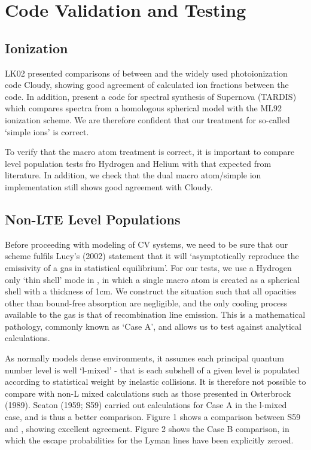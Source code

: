 \documentclass[useAMS,usenatbib, onecolumn]{mn2ejm}
\begin{document}
\section{Code Validation and Testing}
\subsection{Ionization}

LK02 presented comparisons of between \py and the widely used photoionization code Cloudy, showing good agreement 
of calculated ion fractions between the code. In addition, \cite{tardis} present a code for 
spectral synthesis of Supernova (\textsc{TARDIS}) which compares spectra from a homologous spherical model with
the ML92 ionization scheme. We are therefore confident that our treatment for so-called `simple ions' is correct.

To verify that the macro atom treatment is correct, it is important to compare level population tests 
fro Hydrogen and Helium with that expected from literature. In addition, we check that the dual macro atom/simple ion
implementation still shows good agreement with Cloudy.



\subsection{Non-LTE Level Populations}

Before proceeding with modeling of CV systems, we need to be sure that our scheme fulfils Lucy's (2002) 
statement that it will `asymptotically reproduce the emissivity of a gas in statistical equilibrium'.
For our tests, we use a Hydrogen only `thin shell' mode in \py, in which a single macro atom is created as a spherical 
shell with a thickness of 1cm. We construct the situation such that all opacities other than 
bound-free absorption are negligible, and the only cooling process available to the gas is that of
recombination line emission. This is a mathematical pathology, commonly known as `Case A', and allows
us to test against analytical calculations.

As \py normally models dense environments, it assumes each principal quantum number level is
well `l-mixed' - that is each subshell of a given level is populated according to statistical weight by
inelastic collisions. It is therefore not possible to compare with non-L mixed calculations such as 
those presented in Osterbrock (1989\nocite{oster}). Seaton (1959; S59\nocite{seaton}) carried out calculations
for Case A in the l-mixed case, and is thus a better comparison. Figure 1 shows a comparison between S59
and \py, showing excellent agreement. Figure 2 shows the Case B comparison, in which the escape probabilities
for the Lyman lines have been explicitly zeroed.
\end{document}
